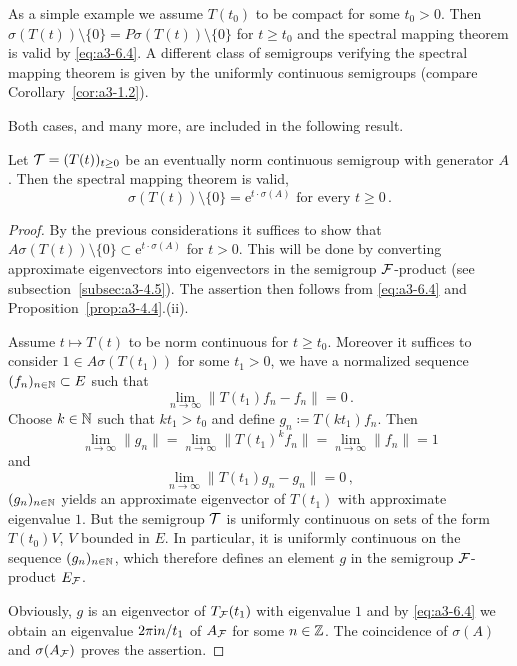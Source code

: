 As a simple example we assume $T(t_{0})$ to be compact for some $t_{0} > 0$.
Then $\sigma(T(t)) \setminus \{0\} = P\sigma(T(t)) \setminus \{0\}$ for $t \geq t_{0}$ and the spectral mapping theorem is valid by \eqref{eq:a3-6.4}.
A different class of semigroups verifying the spectral mapping theorem is given by the uniformly continuous semigroups (compare Corollary~\ref{cor:a3-1.2}).

Both cases, and many more, are included in the following result.
\begin{theorem}\label{thm:a3-6.6}
Let $\mathcal{T} = (T(t))_{t\geq 0}$ be an eventually norm continuous semigroup with generator $A$.
Then the spectral mapping theorem is valid, \ie 
\begin{equation}\label{eq:a3-6.6)}
	\sigma(T(t)) \setminus \{0\} = \mathrm{e}^{t \cdot \sigma(A)} \text{ for every } t \geq 0\,.
\end{equation}
\end{theorem}
\begin{proof}
By the previous considerations it suffices to show that $A\sigma(T(t)) \setminus \{0\} \subset \mathrm{e}^{t \cdot \sigma(A)}$ for $t > 0$.
This will be done by converting approximate eigenvectors into eigenvectors in the semigroup $\mathcal{F}$-product (see subsection~\ref{subsec:a3-4.5}).
The assertion then follows from \eqref{eq:a3-6.4} and Proposition~\ref{prop:a3-4.4}.(ii).

Assume $t \mapsto T(t)$ to be norm continuous for $t \geq t_{0}$.
Moreover it suffices to consider $1 \in A\sigma(T(t_{1}))$ for some $t_{1} > 0$, \ie we have a normalized sequence $(f_{n})_{n\in\mathbb{N}} \subset E$ such that
\[
\lim_{n\to\infty} \|T(t_{1})f_{n} - f_{n}\| = 0\,.
\]
Choose $k \in \mathbb{N}$ such that $kt_{1} > t_{0}$ and define $g_{n} \coloneqq T(kt_{1})f_{n}$.
Then
\[
\lim_{n\to\infty}\|g_{n}\| = \lim_{n\to\infty}\|T(t_{1})^{k}f_{n}\| = \lim_{n\to\infty}\|f_{n}\| = 1
\]
and
\[
\lim_{n\to\infty} \|T(t_{1})g_{n} - g_{n}\| = 0\,,
\]
\ie $(g_{n})_{n\in\mathbb{N}}$ yields an approximate eigenvector of $T(t_{1})$ with approximate eigenvalue $1$.
But the semigroup $\mathcal{T}$ is uniformly continuous on sets of the form $T(t_{0})V$, $V$ bounded in $E$.
In particular, it is uniformly continuous on the sequence $(g_{n})_{n\in\mathbb{N}}$, which therefore defines an element $g$ in the semigroup $\mathcal{F}$-product $E_{\mathcal{F}}$.

Obviously, $g$ is an eigenvector of $T_{\mathcal{F}}(t_{1})$ with eigenvalue $1$ and by \eqref{eq:a3-6.4} we obtain an eigenvalue $2\pi\mathrm{i}  n/t_{1}$ of $A_{\mathcal{F}}$ for some $n \in \mathbb{Z}$.
The coincidence of $\sigma(A)$ and $\sigma(A_{\mathcal{F}})$ proves the assertion.
\end{proof}
